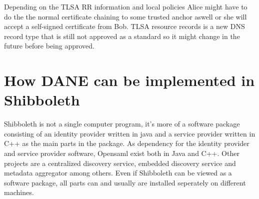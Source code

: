 Depending on the TLSA RR information and local policies Alice might have to do the the normal certificate chaining to some trusted anchor aswell or she will accept a self-signed certificate from Bob.
TLSA resource records is a new DNS record type that is still not approved as a standard so it might change in the future before being approved.




\section{How DANE can be implemented in Shibboleth}
Shibboleth is not a single computer program, it's more of a software package consisting of an identity provider written in java and a service provider written in C++ as the main parts in the package.
As dependency for the identity provider and service provider software, Opensaml exist both in Java and C++.
Other projects are a centralized discovery service, embedded discovery service and  metadata aggregator among others.
Even if Shibboleth can be viewed as a software package, all parts can and usually are installed seperately on different machines.

